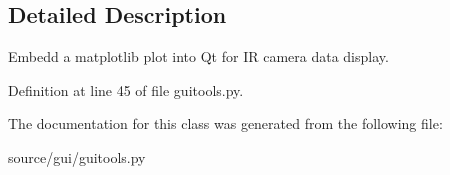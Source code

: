 \subsection{Detailed Description}
Embedd a matplotlib plot into Qt for IR camera data display. 

Definition at line 45 of file guitools.\+py.



The documentation for this class was generated from the following file\+:\begin{DoxyCompactItemize}
\item 
source/gui/guitools.\+py\end{DoxyCompactItemize}
